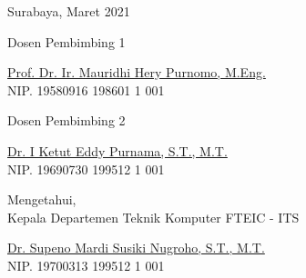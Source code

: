 \begin{flushright}
  Surabaya, Maret 2021
\end{flushright}
\vspace{2ex}

\begin{center}

  \begin{multicols}{2}

    Dosen Pembimbing 1
    \vspace{16ex}

    \underline{Prof. Dr. Ir. Mauridhi Hery Purnomo, M.Eng.} \\
    NIP. 19580916 198601 1 001

    \columnbreak

    Dosen Pembimbing 2
    \vspace{16ex}

    \underline{Dr. I Ketut Eddy Purnama, S.T., M.T.} \\
    NIP. 19690730 199512 1 001

  \end{multicols}
  \vspace{10ex}

  Mengetahui, \\
  Kepala Departemen Teknik Komputer FTEIC - ITS
  \vspace{16ex}

  \underline{Dr. Supeno Mardi Susiki Nugroho, S.T., M.T.} \\
  NIP. 19700313 199512 1 001

\end{center}
